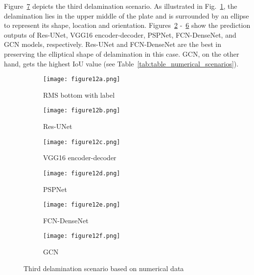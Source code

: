 Figure~\ref{fig:475_softmax} depicts the third delamination scenario.
As illustrated in Fig.~\ref{fig:RMS_flat_shell_Vz_475}, the delamination lies in the upper middle of the plate and is surrounded by an ellipse to represent its shape, location and orientation.
Figures~\ref{fig:Unet_Pred__softmax_475} -~\ref{fig:gcn_pred_475} show the prediction outputs of Res-UNet, VGG16 encoder-decoder, PSPNet, FCN-DenseNet, and GCN models, respectively. 
Res-UNet and FCN-DenseNet are the best in preserving the elliptical shape of delamination in this case.
GCN, on the other hand, gets the highest IoU value (see Table~\ref{tab:table_numerical_scenarios}).
\begin{figure}[!h]
	\centering
	\begin{subfigure}[b]{0.47\textwidth}
		\centering
		\texttt{[image: figure12a.png]}
		\caption{RMS bottom with label}
		\label{fig:RMS_flat_shell_Vz_475}
	\end{subfigure}
	\hfill
	\begin{subfigure}[b]{0.47\textwidth}
		\centering
		\texttt{[image: figure12b.png]}
		\caption{Res-UNet}
		\label{fig:Unet_Pred__softmax_475}
	\end{subfigure}
	\hfill
	\begin{subfigure}[b]{0.47\textwidth}
		\centering
		\texttt{[image: figure12c.png]}
		\caption{VGG16 encoder-decoder}			\label{fig:vgg16_pred__softmax_475}			
	\end{subfigure}
	\hfill
	\begin{subfigure}[b]{0.47\textwidth}
		\centering
		\texttt{[image: figure12d.png]}
		\caption{PSPNet}
		\label{fig:pspnet_pred__softmax_475}
	\end{subfigure}	
	\hfill
	\begin{subfigure}[b]{0.47\textwidth}
		\centering
		\texttt{[image: figure12e.png]}
		\caption{FCN-DenseNet}
		\label{fig:fcn_densenet_pred__softmax_475}
	\end{subfigure}
	\hfill
	\begin{subfigure}[b]{0.47\textwidth}
		\centering
		\texttt{[image: figure12f.png]}
		\caption{GCN}
		\label{fig:gcn_pred_475}
	\end{subfigure}	
	\caption{Third delamination scenario based on numerical data}
	\label{fig:475_softmax}
\end{figure}
\clearpage

